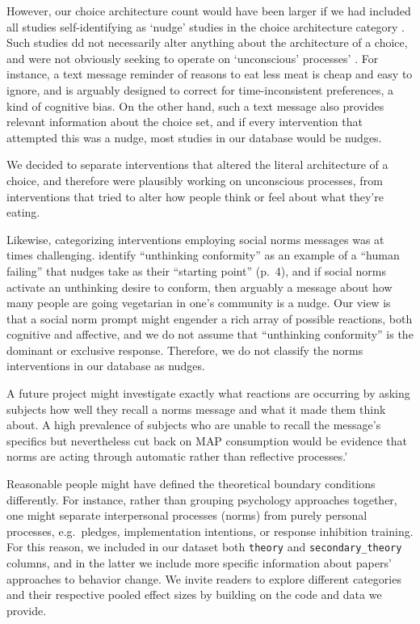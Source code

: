 \documentclass[sn-nature,referee,pdflatex]{sn-jnl}
\begin{document}
However, our choice architecture count would have been larger if we had
included all studies self-identifying as `nudge' studies in the choice
architecture category \citep{thaler2009}. Such studies dd not
necessarily alter anything about the architecture of a choice, and were
not obviously seeking to operate on `unconscious' processes'
\citep{garnett2020}. For instance, a text message reminder of reasons to
eat less meat is cheap and easy to ignore, and is arguably designed to
correct for time-inconsistent preferences, a kind of cognitive bias. On
the other hand, such a text message also provides relevant information
about the choice set, and if every intervention that attempted this was
a nudge, most studies in our database would be nudges.

We decided to separate interventions that altered the literal
architecture of a choice, and therefore were plausibly working on
unconscious processes, from interventions that tried to alter how people
think or feel about what they're eating.

Likewise, categorizing interventions employing social norms messages was
at times challenging. \citep{mols2015} identify ``unthinking
conformity'' as an example of a ``human failing'' that nudges take as
their ``starting point'' (p.~4), and if social norms activate an
unthinking desire to conform, then arguably a message about how many
people are going vegetarian in one's community is a nudge. Our view is
that a social norm prompt might engender a rich array of possible
reactions, both cognitive and affective, and we do not assume that
``unthinking conformity'' is the dominant or exclusive response.
Therefore, we do not classify the norms interventions in our database as
nudges.

A future project might investigate exactly what reactions are occurring
by asking subjects how well they recall a norms message and what it made
them think about. A high prevalence of subjects who are unable to recall
the message's specifics but nevertheless cut back on MAP consumption
would be evidence that norms are acting through automatic rather than
reflective processes.'

Reasonable people might have defined the theoretical boundary conditions
differently. For instance, rather than grouping psychology approaches
together, one might separate interpersonal processes (norms) from purely
personal processes, e.g.~pledges, implementation intentions, or response
inhibition training. For this reason, we included in our dataset both
\texttt{theory} and \texttt{secondary\_theory} columns, and in the
latter we include more specific information about papers' approaches to
behavior change. We invite readers to explore different categories and
their respective pooled effect sizes by building on the code and data we
provide.
\end{document}
